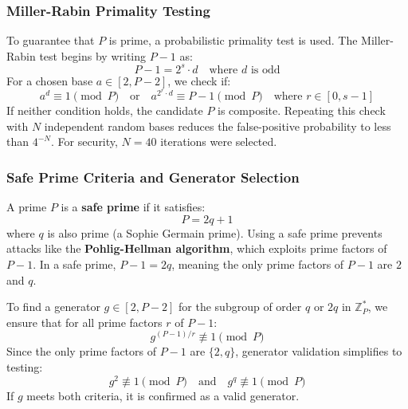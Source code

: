 \documentclass[11pt,a4paper]{article}
\begin{document}
\subsubsection{Miller-Rabin Primality Testing}
To guarantee that $P$ is prime, a probabilistic primality test is used. The Miller-Rabin test begins by writing $P-1$ as:
\begin{equation}
    P - 1 = 2^s \cdot d \quad \text{where } d \text{ is odd}
\end{equation}
For a chosen base $a \in [2, P-2]$, we check if:
\begin{equation}
    a^d \equiv 1 \pmod{P} \quad \text{or} \quad a^{2^r \cdot d} \equiv P - 1 \pmod{P} \quad \text{where } r \in [0, s-1]
\end{equation}
If neither condition holds, the candidate $P$ is composite. Repeating this check with $N$ independent random bases reduces the false-positive probability to less than $4^{-N}$. For security, $N = 40$ iterations were selected.

\subsubsection{Safe Prime Criteria and Generator Selection}
A prime $P$ is a \textbf{safe prime} if it satisfies:
\begin{equation}
    P = 2q + 1
\end{equation}
where $q$ is also prime (a Sophie Germain prime). Using a safe prime prevents attacks like the \textbf{Pohlig-Hellman algorithm}, which exploits prime factors of $P-1$. In a safe prime, $P-1 = 2q$, meaning the only prime factors of $P-1$ are $2$ and $q$.

To find a generator $g \in [2, P-2]$ for the subgroup of order $q$ or $2q$ in $\mathbb{Z}_P^*$, we ensure that for all prime factors $r$ of $P-1$:
\begin{equation}
    g^{(P-1)/r} \not\equiv 1 \pmod{P}
\end{equation}
Since the only prime factors of $P-1$ are $\{2, q\}$, generator validation simplifies to testing:
\begin{equation}
    g^2 \not\equiv 1 \pmod{P} \quad \text{and} \quad g^q \not\equiv 1 \pmod{P}
\end{equation}
If $g$ meets both criteria, it is confirmed as a valid generator.
\end{document}
